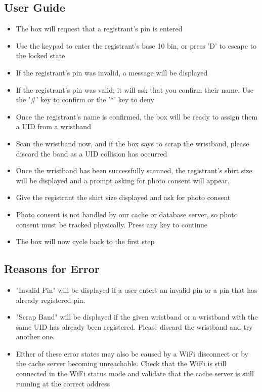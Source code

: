 \documentclass{article}
\begin{document}
\subsection{User Guide}
\begin{itemize}
	\item The box will request that a registrant's pin is entered
	\item Use the keypad to enter the registrant's base 10 bin, or press 'D' to escape to the locked state
	\item If the registrant's pin was invalid, a message will be displayed
	\item If the registrant's pin was valid; it will ask that you confirm their name.  Use the '\#' key to confirm or the '*' key to deny
	\item Once the registrant's name is confirmed, the box will be ready to assign them a UID from a wristband
	\item Scan the wristband now, and if the box says to scrap the wristband, please discard the band as a UID collision has occurred
	\item Once the wristband has been successfully scanned, the registrant's shirt size will be displayed and a prompt asking for photo consent will appear.
	\item Give the registrant the shirt size displayed and ask for photo consent
	\item Photo consent is not handled by our cache or database server, so photo consent must be tracked physically.  Press any key to continue
	\item The box will now cycle back to the first step
\end{itemize}
\subsection{Reasons for Error}
\begin{itemize}
	\item "Invalid Pin" will be displayed if a user enters an invalid pin or a pin that has already registered pin.
	\item "Scrap Band" will be displayed if the given wristband or a wristband with the same UID has already been registered.  Please discard the wristband and try another one.
	\item Either of these error states may also be caused by a WiFi disconnect or by the cache server becoming unreachable.  Check that the WiFi is still connected in the WiFi status mode and validate that the cache server is still running at the correct address
\end{itemize}
\end{document}
